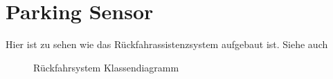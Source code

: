 \documentclass[entwurf.tex]{subfiles}
\begin{document}
  		
  		
  	\newpage
  	\section{Parking Sensor}
		Hier ist zu sehen wie das Rückfahrassistenzsystem aufgebaut ist. Siehe auch %
		\begin{figure}[H]
  			\caption{Rückfahrsystem Klassendiagramm}
  		\end{figure}
  	
  	
\end{document}
